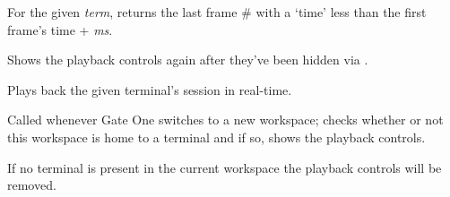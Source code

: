 \documentclass[letterpaper,10pt,openany]{sphinxmanual}
\begin{document}

\begin{fulllineitems}
\label{Applications/terminal/plugin_playback:GateOne.Playback.selectFrame}
For the given \emph{term}, returns the last frame \# with a `time' less than the first frame's time + \emph{ms}.

\end{fulllineitems}


\begin{fulllineitems}
\label{Applications/terminal/plugin_playback:GateOne.Playback.showsControls}
Shows the playback controls again after they've been hidden via {\hyperref[Applications/terminal/plugin_playback:GateOne.Playback.hideControls]{}}.

\end{fulllineitems}


\begin{fulllineitems}
\label{Applications/terminal/plugin_playback:GateOne.Playback.startPlayback}
Plays back the given terminal's session in real-time.

\end{fulllineitems}


\begin{fulllineitems}
\label{Applications/terminal/plugin_playback:GateOne.Playback.switchWorkspaceEvent}
Called whenever Gate One switches to a new workspace; checks whether or not this workspace is home to a terminal and if so, shows the playback controls.

If no terminal is present in the current workspace the playback controls will be removed.

\end{fulllineitems}
\end{document}
